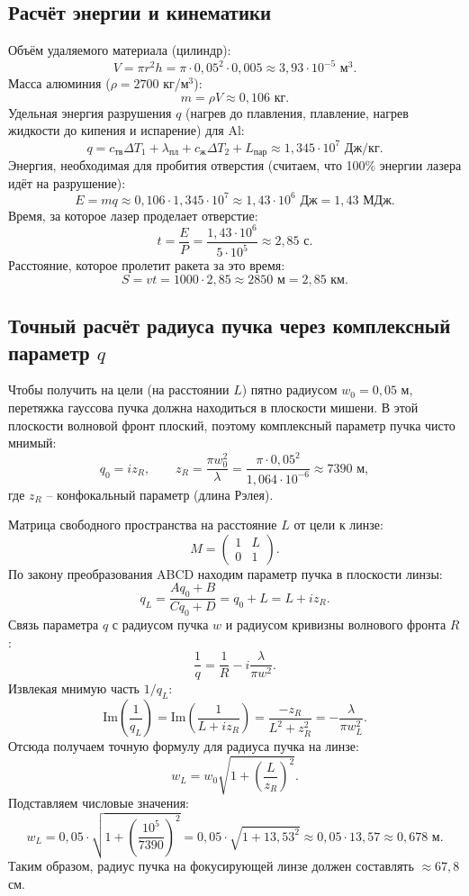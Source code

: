 \documentclass[12pt, a4paper]{article}
\begin{document}
\subsection*{Расчёт энергии и кинематики}
Объём удаляемого материала (цилиндр):
\[
V = \pi r^2 h = \pi \cdot 0{,}05^2 \cdot 0{,}005 \approx 3{,}93 \cdot 10^{-5} \text{ м}^3.
\]
Масса алюминия ($\rho = 2700$ кг/м$^3$):
\[
m = \rho V \approx 0{,}106 \text{ кг}.
\]
Удельная энергия разрушения $q$ (нагрев до плавления, плавление, нагрев жидкости до кипения и испарение) для Al:
\[
q = c_{\text{тв}}\Delta T_1 + \lambda_{\text{пл}} + c_{\text{ж}}\Delta T_2 + L_{\text{пар}} \approx 1{,}345 \cdot 10^7 \text{ Дж/кг}.
\]
Энергия, необходимая для пробития отверстия (считаем, что 100\% энергии лазера идёт на разрушение):
\[
E = m q \approx 0{,}106 \cdot 1{,}345 \cdot 10^7 \approx 1{,}43 \cdot 10^6 \text{ Дж} = 1{,}43 \text{ МДж}.
\]
Время, за которое лазер проделает отверстие:
\[
t = \frac{E}{P} = \frac{1{,}43 \cdot 10^6}{5 \cdot 10^5} \approx 2{,}85 \text{ с}.
\]
Расстояние, которое пролетит ракета за это время:
\[
S = v t = 1000 \cdot 2{,}85 \approx 2850 \text{ м} = 2{,}85 \text{ км}.
\]

\subsection*{Точный расчёт радиуса пучка через комплексный параметр $q$}
Чтобы получить на цели (на расстоянии $L$) пятно радиусом $w_0 = 0{,}05$ м, перетяжка гауссова пучка должна находиться в плоскости мишени. В этой плоскости волновой фронт плоский, поэтому комплексный параметр пучка чисто мнимый:
\[
q_0 = i z_R, \qquad z_R = \frac{\pi w_0^2}{\lambda} = \frac{\pi \cdot 0{,}05^2}{1{,}064 \cdot 10^{-6}} \approx 7390 \text{ м},
\]
где $z_R$ -- конфокальный параметр (длина Рэлея).

Матрица свободного пространства на расстояние $L$ от цели к линзе:
\[
M = \begin{pmatrix} 1 & L \\ 0 & 1 \end{pmatrix}.
\]
По закону преобразования ABCD находим параметр пучка в плоскости линзы:
\[
q_L = \frac{A q_0 + B}{C q_0 + D} = q_0 + L = L + i z_R.
\]
Связь параметра $q$ с радиусом пучка $w$ и радиусом кривизны волнового фронта $R$:
\[
\frac{1}{q} = \frac{1}{R} - i \frac{\lambda}{\pi w^2}.
\]
Извлекая мнимую часть $1/q_L$:
\[
\text{Im}\left(\frac{1}{q_L}\right) = \text{Im}\left(\frac{1}{L + i z_R}\right) = \frac{-z_R}{L^2 + z_R^2} = -\frac{\lambda}{\pi w_L^2}.
\]
Отсюда получаем точную формулу для радиуса пучка на линзе:
\[
w_L = w_0 \sqrt{1 + \left(\frac{L}{z_R}\right)^2}.
\]
Подставляем числовые значения:
\[
w_L = 0{,}05 \cdot \sqrt{1 + \left(\frac{10^5}{7390}\right)^2} = 0{,}05 \cdot \sqrt{1 + 13{,}53^2} \approx 0{,}05 \cdot 13{,}57 \approx 0{,}678 \text{ м}.
\]
Таким образом, радиус пучка на фокусирующей линзе должен составлять $\approx 67{,}8$ см.
\end{document}
